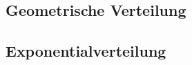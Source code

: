\documentclass[12pt, a4paper]{scrreprt}
\begin{document}
\begin{figure}[H]
  \subsection{Geometrische Verteilung}
\end{figure}

\begin{figure}[H]
  \subsection{Exponentialverteilung}
\end{figure}


\clearpage
{}%
\addtocounter{chapter}{1}

\end{document}
